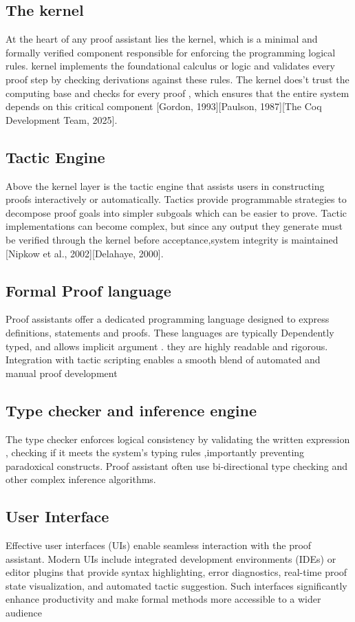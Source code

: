 \documentclass[12pt]{article}
\begin{document}
\subsection{The kernel} 
At the heart of any proof assistant lies the kernel, which is a minimal and formally verified component responsible for enforcing the programming logical rules. kernel implements the foundational calculus or logic and validates every proof
step by checking derivations against these rules. The kernel does't trust the computing base and checks for every proof , which ensures that the entire system depends on this critical component [Gordon, 1993][Paulson, 1987][The Coq Development Team, 2025].
\subsection{Tactic Engine}
Above the kernel layer is the tactic engine that assists users in constructing proofs interactively or automatically.
Tactics provide programmable strategies to decompose proof goals into simpler subgoals which can be easier to prove. 
Tactic implementations can become complex, but since any output they generate must be verified through the
kernel before acceptance,system integrity is maintained [Nipkow et al., 2002][Delahaye, 2000]. 


\subsection{Formal Proof language}
Proof assistants offer a dedicated programming language designed to express definitions, statements and proofs. These languages are typically Dependently typed,
and allows implicit argument . they are highly readable and rigorous. Integration with tactic scripting enables a smooth blend of automated and manual proof development \cite{}

\subsection{Type checker and inference engine}
The type checker enforces logical consistency by validating the written expression , checking if it meets the system's typing
rules ,importantly preventing paradoxical constructs. Proof assistant often use bi-directional type checking and other 
complex inference algorithms.

\subsection{User Interface} 
Effective user interfaces (UIs) enable seamless interaction with the proof assistant. 
Modern UIs include integrated development environments (IDEs) or editor plugins that provide syntax highlighting, error diagnostics, real-time proof state visualization,
and automated tactic suggestion. Such interfaces significantly enhance productivity and make formal methods more accessible to a wider audience \cite{isabelle2023}
\end{document}

